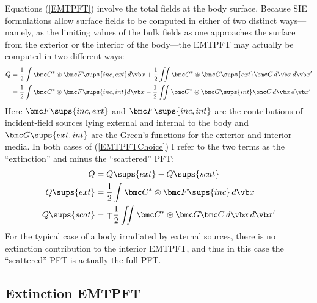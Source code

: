 Equations (\ref{EMTPFT}) involve the total fields at the
body surface. Because SIE formulations allow surface fields
to be computed in either of two distinct ways---namely, as the
limiting values of the bulk fields as one approaches the
surface from the exterior or the interior of the body---the EMTPFT
may actually be computed in two different ways:
\begin{subequations}
\begin{align}
 Q &= \frac{1}{2}  \int \bmc C^* \circledast \bmc F\sups{inc,ext} d\vb x
     +\frac{1}{2} \iint \bmc C^* \circledast \bmc G\sups{ext} \bmc C\,d\vb x \,d\vb x^\prime
\\
   &= \frac{1}{2}  \int \bmc C^* \circledast \bmc F\sups{inc,int} d\vb x
     -\frac{1}{2} \iint \bmc C^* \circledast \bmc G\sups{int} \bmc C\,d\vb x \,d\vb x^\prime
\end{align}
\label{EMTPFTChoice}
\end{subequations}
Here $\bmc F\sups{inc,ext}$ and $\bmc F\sups{inc,int}$ are
the contributions of incident-field sources lying external and internal
to the body and $\bmc G\sups{ext,int}$ are the Green's functions
for the exterior and interior media.
In both cases of (\ref{EMTPFTChoice}) I refer to the two
terms as the ``extinction'' and minus the ``scattered''
PFT:
\begin{align*}
 Q&=Q\sups{ext} - Q\sups{scat}
\\
 Q\sups{ext}
&=\frac{1}{2}\int \bmc C^* \circledast \bmc F\sups{inc} \, d\vb x
\\
 Q\sups{scat}
&=\mp \frac{1}{2} \iint \bmc C^* \circledast \bmc G \bmc C\,d\vb x \, d\vb x^\prime
\end{align*}
For the typical case of a body irradiated by external sources,
there is no extinction contribution to the interior EMTPFT, and 
thus in this case the ``scattered'' PFT is actually the full PFT.

\subsection{Extinction EMTPFT}

